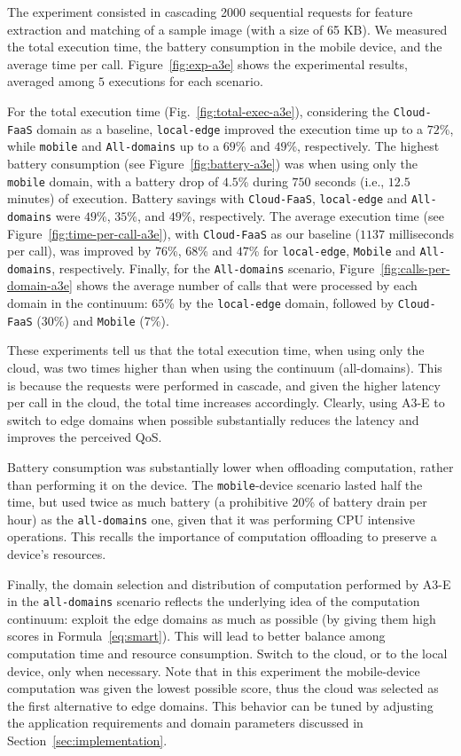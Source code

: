 
The experiment consisted in cascading 2000 sequential requests for feature extraction and matching of a sample image (with a size of 65 KB). We measured the total execution time, the battery consumption in the mobile device, and the average time per call. Figure~\ref{fig:exp-a3e} shows the experimental results, averaged among $5$ executions for each scenario.

For the total execution time (Fig.~\ref{fig:total-exec-a3e}), considering the \texttt{Cloud-FaaS} domain as a baseline, \texttt{local-edge} improved the execution time up to a $72$\%, while \texttt{mobile} and \texttt{All-domains} up to a $69$\% and $49$\%, respectively. The highest battery consumption (see Figure~\ref{fig:battery-a3e}) was when using only the \texttt{mobile} domain, with a battery drop of $4.5$\% during $750$ seconds (i.e., $12.5$ minutes) of execution. Battery savings with \texttt{Cloud-FaaS}, \texttt{local-edge} and \texttt{All-domains} were $49$\%, $35$\%, and $49$\%, respectively. The average execution time (see Figure~\ref{fig:time-per-call-a3e}), with \texttt{Cloud-FaaS} as our baseline ($1137$ milliseconds per call), was improved by $76$\%, $68$\% and $47$\% for \texttt{local-edge}, \texttt{Mobile} and \texttt{All-domains}, respectively. Finally, for the \texttt{All-domains} scenario, Figure~\ref{fig:calls-per-domain-a3e} shows the average number of calls that were processed by each domain in the continuum: $65$\% by the \texttt{local-edge} domain, followed by \texttt{Cloud-FaaS} ($30$\%) and \texttt{Mobile} ($7$\%).
 
These experiments tell us that the total execution time, when using only the cloud, was two times higher than when using the continuum (all-domains). This is because the requests were performed in cascade, and given the higher latency per call in the cloud, the total time increases accordingly. Clearly, using A3-E to switch to edge domains when possible substantially reduces the latency and improves the perceived QoS.

Battery consumption was substantially lower when offloading computation, rather than performing it on the device. The \texttt{mobile}-device scenario lasted half the time, but used twice as much battery (a prohibitive $20$\% of battery drain per hour) as the \texttt{all-domains} one, given that it was performing CPU intensive operations. This recalls the importance of computation offloading to preserve a device's resources.

Finally, the domain selection and distribution of computation performed by A3-E in the \texttt{all-domains} scenario reflects the underlying idea of the computation continuum: exploit the edge domains as much as possible (by giving them high scores in Formula~\ref{eq:smart}). This will lead to better balance among computation time and resource consumption. Switch to the cloud, or to the local device, only when necessary. Note that in this experiment the mobile-device computation was given the lowest possible score, thus the cloud was selected as the first alternative to edge domains. This behavior can be tuned by adjusting the application requirements and domain parameters discussed in Section~\ref{sec:implementation}.

